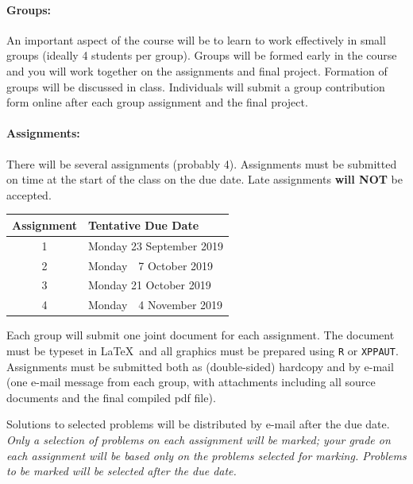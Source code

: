 \documentclass[12pt]{article}
\newcommand{\note}{\noindent{\bfseries\slshape Note:\/} }
\begin{document}
\paragraph*{Groups:} An important aspect of the course will be to learn to work effectively in small groups (ideally 4 students per group).  Groups will be formed early in the course and you will work together on the assignments and final project.  Formation of groups will be discussed in class.  Individuals will submit a group contribution form online after each group assignment and the final project.

\paragraph*{Assignments:} There will be several assignments (probably 4).  Assignments must be submitted on time at the start of the class on the due date.  Late assignments {\bf will NOT} be accepted.
%
\begin{center}
\begin{tabular}{c|l}
\bf Assignment & \bf Tentative Due Date \\\hline
1 & Monday 23 September 2019 \\
2 & Monday ~\,7 October 2019 \\
3 & Monday 21 October 2019 \\
4 & Monday ~\,4 November 2019 \\
\end{tabular}
\end{center}
%
\noindent
Each group will submit one joint document for each assignment.  The document must be typeset in \LaTeX\ and all graphics must be prepared using {\tt R} or {\tt XPPAUT}.  Assignments must be submitted both as (double-sided) hardcopy and by e-mail (one e-mail message from each group, with attachments including all source documents and the final compiled pdf file).

Solutions to selected problems will be distributed by e-mail after the due date.
\note \emph{Only a selection of problems on each assignment will be marked; your grade on each assignment will be based only on the problems selected for marking.  Problems to be marked will be selected after the due date.}

\end{document}
